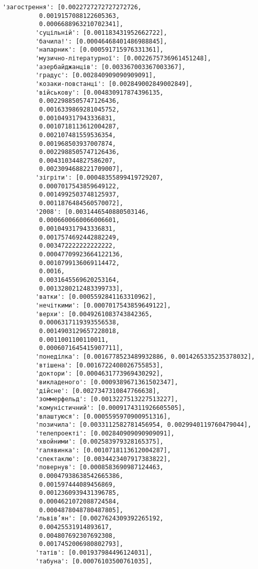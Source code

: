 \documentclass[11pt]{article}
\begin{document}
\begin{Verbatim}[commandchars=\\\{\}]
         'загострення': [0.0022727272727272726,
          0.0019157088122605363,
          0.0006688963210702341],
         'суцільній': [0.001183431952662722],
         'бачила!': [0.00046468401486988845],
         'напарник': [0.000591715976331361],
         'музично-літературної': [0.0022675736961451248],
         'азербайджанців': [0.003367003367003367],
         'градус': [0.002840909090909091],
         'козаки-повстанці': [0.002849002849002849],
         'військову': [0.004830917874396135,
          0.0022988505747126436,
          0.0016339869281045752,
          0.001049317943336831,
          0.0010718113612004287,
          0.002107481559536354,
          0.001968503937007874,
          0.0022988505747126436,
          0.004310344827586207,
          0.0023094688221709007],
         'зігріти': [0.00048355899419729207,
          0.0007017543859649122,
          0.0014992503748125937,
          0.0011876484560570072],
         '2008': [0.0031446540880503146,
          0.0006600660066006601,
          0.001049317943336831,
          0.0017574692442882249,
          0.003472222222222222,
          0.00047709923664122136,
          0.0010799136069114472,
          0.0016,
          0.0031645569620253164,
          0.0013280212483399733],
         'ватки': [0.0005592841163310962],
         'нечіткими': [0.0007017543859649122],
         'верхи': [0.0049261083743842365,
          0.0006317119393556538,
          0.0014903129657228018,
          0.0011001100110011,
          0.0006071645415907711],
         'понеділка': [0.0016778523489932886, 0.0014265335235378032],
         'втішена': [0.0016722408026755853],
         'доктори': [0.0004631773969430292],
         'викладеного': [0.0009389671361502347],
         'дійсне': [0.0027347310847766638],
         'зоммерфельд': [0.0013227513227513227],
         'комуністичний': [0.0009174311926605505],
         'влаштуюся': [0.0005595970900951316],
         'позичила': [0.0033112582781456954, 0.0029940119760479044],
         'телепроекті': [0.002840909090909091],
         'хвойними': [0.002583979328165375],
         'галявинка': [0.0010718113612004287],
         'спектаклю': [0.0034423407917383822],
         'повернув': [0.0008583690987124463,
          0.00047938638542665386,
          0.001597444089456869,
          0.0012360939431396785,
          0.0004621072088724584,
          0.0004878048780487805],
         'львів’ян': [0.0027624309392265192,
          0.00425531914893617,
          0.004807692307692308,
          0.0017452006980802793],
         'татів': [0.001937984496124031],
         'табуна': [0.00076103500761035],

\end{Verbatim}
\end{document}
